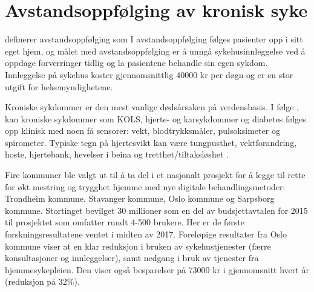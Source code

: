 \section{Avstandsoppfølging av kronisk syke}
\label{sec:remotemonitoring}
\citet{rojahn2016remote} definerer avstandsoppfølging som 
I avstandsoppfølging følges pasienter opp i sitt eget hjem, og
målet med avstandsoppfølging er å unngå sykehusinnleggelse ved å oppdage forverringer tidlig og la
pasientene behandle sin egen sykdom. Innleggelse på sykehus koster gjennomsnittlig 40000 kr per døgn og er en stor utgift
for helsemyndighetene. %

Kroniske sykdommer er den mest vanlige dødsårsaken på verdensbasis. %
I følge \citet{austad2016sensorer}, kan kroniske sykdommer som KOLS, hjerte- og karsykdommer og diabetes
følges opp klinisk med noen få sensorer: vekt, blodtrykksmåler, pulsoksimeter og spirometer. Typiske
tegn på hjertesvikt kan være tungpusthet, vektforandring, hoste, hjertebank, hevelser i beina og
tretthet/tiltaksløshet \citep{ehelse_hjertesvikt}. %

Fire kommuner ble valgt ut til å ta del i et nasjonalt prosjekt for å legge til rette for økt mestring
og trygghet hjemme med nye digitale behandlingsmetoder: Trondheim kommune, Stavanger kommune, Oslo kommune og Sarpsborg kommune.
Stortinget bevilget 30 millioner som en del av budsjettavtalen for 2015 til prosjektet som omfatter rundt 4-500 brukere. %
Her er de første forskningsresultatene ventet i midten av 2017. Foreløpige resultater fra Oslo kommune viser at
en klar reduksjon i bruken av sykehustjenester (færre konsultasjoner og innleggelser), samt nedgang i bruk av
tjenester fra hjemmesykepleien. Den viser også besparelser på 73000 kr i gjennomsnitt hvert år (reduksjon på 32\%).

